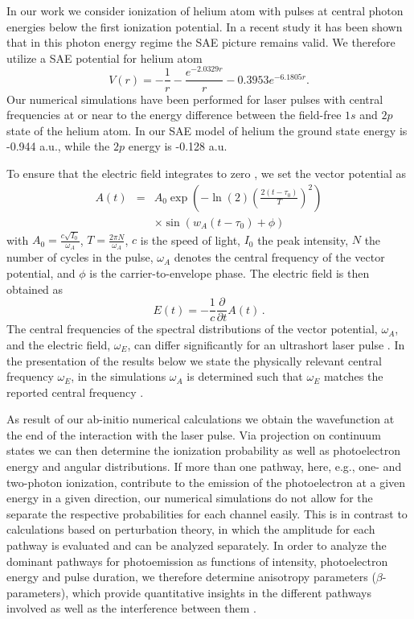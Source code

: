 In our work we consider ionization of helium atom with pulses at central photon energies below the first ionization potential. In a recent study \cite{boll2019} it has been shown that in this photon energy regime the SAE picture remains valid. We therefore utilize a SAE potential for helium atom 
%
\begin{equation}
V(r) = -\frac{1}{r} - \frac{e^{-2.0329r}}{r} - 0.3953 e^{-6.1805r}.
\end{equation}
%
Our numerical simulations have been performed for laser pulses with central frequencies at or near to the energy difference between the field-free $1s$ and $2p$ state of the helium atom. In our SAE model of helium the ground state energy is -0.944 a.u., while the $2p$ energy is -0.128 a.u.

To ensure that the electric field 
integrates to zero \cite{chelkowski2002}, we set the vector potential as
%
\begin{eqnarray}
A(t) &=& 
      A_0 \exp\left(-\ln(2)\left(\frac{2(t-\tau_0)}{T}\right)^2\right)
      \nonumber
      \\
      && \times \sin\left(w_A(t-\tau_0)+\phi \right) 
      \label{eq:vectorp}
\end{eqnarray}
%
with $A_0 = \frac{c\sqrt{I_0}}{\omega_A}$, $T = \frac{2\pi N}{\omega_A}$, $c$ is the speed of light, $I_0$ the peak intensity, $N$ the number of cycles in the pulse, $\omega_A$ denotes the central frequency of the vector potential, and $\phi$ is the carrier-to-envelope phase. The electric field is then obtained as
\begin{equation}
    E(t) = -\frac{1}{c}\frac{\partial}{\partial t}A(t)\, .
    \label{eq:e-field}
\end{equation}
The central frequencies of the spectral distributions of the vector potential, $\omega_A$, and the electric field, $\omega_E$, can differ significantly for an ultrashort laser pulse \cite{venzke2018_Central}. In the presentation of the results below we state the physically relevant central frequency $\omega_E$, in the simulations $\omega_A$ is determined such that $\omega_E$ matches the reported central frequency \cite{venzke2018_Central}. 

As result of our ab-initio numerical calculations we obtain the wavefunction at the end of the interaction with the laser pulse. Via projection on continuum states we can then determine the ionization probability as well as photoelectron energy and angular distributions. If more than one pathway, here, e.g., one- and two-photon ionization, contribute to the emission of the photoelectron at a given energy in a given direction, our numerical simulations do not allow for the separate the respective probabilities for each channel easily. This is in contrast to calculations based on perturbation theory, in which the amplitude for each pathway is evaluated and can be analyzed separately. In order to analyze the dominant pathways for photoemission as functions of intensity, photoelectron energy and pulse duration, we therefore determine anisotropy parameters ($\beta$-parameters), which provide quantitative insights in the different pathways involved as well as the interference between them \cite{grum-grzhimailo2015,douguet2016,boll2019}.

